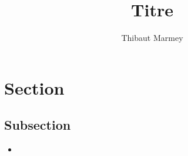\documentclass[12pt,a4paper]{article}
\author{Thibaut Marmey}
\title{Titre}
\begin{document}
	\maketitle

\begin{normalsize}
\tableofcontents
\end{normalsize}

\section{Section}
\subsection{Subsection}
\begin{itemize}
\item 
\end{itemize}
\end{document}
